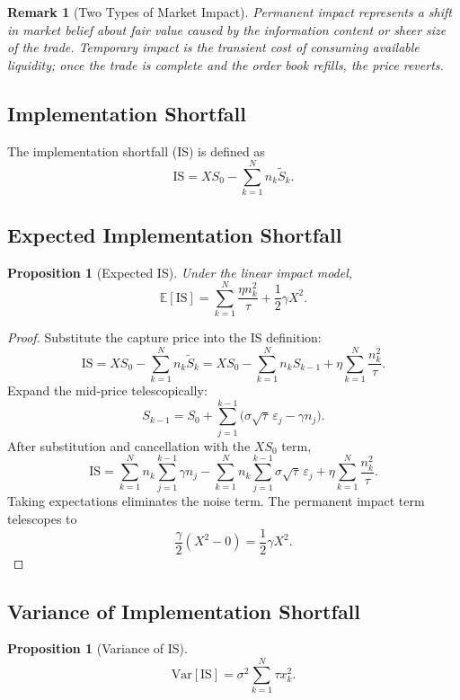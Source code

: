 \documentclass[11pt]{article}
\newtheorem{proposition}[theorem]{Proposition}
\newtheorem{remark}[theorem]{Remark}
\begin{document}
\begin{remark}[Two Types of Market Impact]
\emph{Permanent impact} represents a shift in market belief about fair value caused by the information content or sheer size of the trade. \emph{Temporary impact} is the transient cost of consuming available liquidity; once the trade is complete and the order book refills, the price reverts.
\end{remark}

\subsection{Implementation Shortfall}

The implementation shortfall (IS) is defined as
\[
\text{IS} = X S_0 - \sum_{k=1}^{N} n_k \tilde{S}_k.
\]

\cite{perold1988implementation}

\subsection{Expected Implementation Shortfall}

\begin{proposition}[Expected IS]
Under the linear impact model,
\[
\mathbb{E}[\text{IS}] = \sum_{k=1}^{N} \frac{\eta n_k^2}{\tau} + \frac{1}{2}\gamma X^2.
\]
\end{proposition}

\begin{proof}
Substitute the capture price into the IS definition:
\[
\text{IS} = XS_0 - \sum_{k=1}^N n_k\tilde{S}_k
= XS_0 - \sum_{k=1}^N n_k S_{k-1} + \eta\sum_{k=1}^N \frac{n_k^2}{\tau}.
\]
Expand the mid-price telescopically:
\[
S_{k-1} = S_0 + \sum_{j=1}^{k-1}\bigl(\sigma\sqrt{\tau}\,\varepsilon_j - \gamma n_j\bigr).
\]
After substitution and cancellation with the $XS_0$ term,
\[
\text{IS} = \sum_{k=1}^N n_k \sum_{j=1}^{k-1} \gamma n_j
- \sum_{k=1}^N n_k \sum_{j=1}^{k-1}\sigma\sqrt{\tau}\,\varepsilon_j
+ \eta\sum_{k=1}^N\frac{n_k^2}{\tau}.
\]
Taking expectations eliminates the noise term. The permanent impact term telescopes to
\[
\frac{\gamma}{2}(X^2 - 0) = \frac{1}{2}\gamma X^2.
\]
\end{proof}

\subsection{Variance of Implementation Shortfall}

\begin{proposition}[Variance of IS]
\[
\mathrm{Var}[\mathrm{IS}] = \sigma^2 \sum_{k=1}^{N} \tau x_k^2.
\]
\end{proposition}
\end{document}
